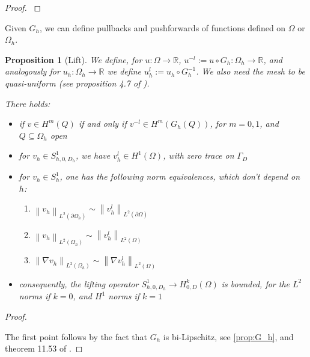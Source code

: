 \documentclass[english,a4paper,9pt,oneside]{scrbook}	%
\theoremstyle{break}
\newtheorem{prop}[equation]{Proposition}
\newenvironment{mproof}[1][\proofname]{%
  \begin{proof}[#1]$ $\par\nobreak\ignorespaces
}{%
  \end{proof}
}
\renewcommand*{\proofname}{Proof}
\theoremstyle{remark}
\newcommand{\mR}{\mathbb{R}}
\newcommand{\norm}[1]{\left\lVert#1\right\rVert}
\begin{document}
\begin{appendices}
\begin{mproof}
\end{mproof}

Given $G_h$, we can define pullbacks and pushforwards of functions defined on $\Omega$ or $\Omega_h$.


\begin{prop}[Lift]
\label{prop:lift}
We define, for $u: \Omega \rightarrow \mR$, $u^{-l}:=u\circ G_h : \Omega_h \rightarrow \mR$, and analogously for $u_h: \Omega_h \rightarrow \mR$ we define $u_h^l:=u_h\circ G_h^{-1}$. We also need the mesh to be quasi-uniform (see proposition 4.7 of \cite{elliott}).

There holds:

\begin{itemize}
	\item if $v\in H^m(Q)$ if and only if $v^{-l} \in H^m(G_h(Q))$, for $m=0,1$, and $Q\subseteq \Omega_h$ open
	\item for $v_h \in S^1_{h,0,D_h}$, we have $v_h^l \in H^1(\Omega)$, with zero trace on $\Gamma_D$ 
	\item for $v_h  \in S^1_h$, one has the following norm equivalences, which don't depend on $h$:
	\begin{enumerate}
		\item $\norm{v_h}_{L^2(\partial \Omega_h)} \sim \norm{v_h^l}_{L^2(\partial \Omega)}$
		\item $\norm{v_h}_{L^2( \Omega_h)} \sim \norm{v_h^l}_{L^2( \Omega)}$
		\item $\norm{\nabla v_h}_{L^2( \Omega_h)} \sim \norm{\nabla v_h^l}_{L^2( \Omega)}$
	\end{enumerate}
	\item consequently, the lifting operator $S^{1}_{h,0,D_h}\rightarrow H^k_{0,D}(\Omega)$ is bounded, for the $L^2$ norms if $k=0$, and $H^1$ norms if $k=1$ 
	
\end{itemize}

\end{prop}

\begin{mproof}

The first point follows by the fact that $G_h$ is bi-Lipschitz, see \cref{prop:G_h}, and theorem 11.53 of \cite{leoni}.

%
%


\end{mproof}
\end{appendices}
\end{document}
